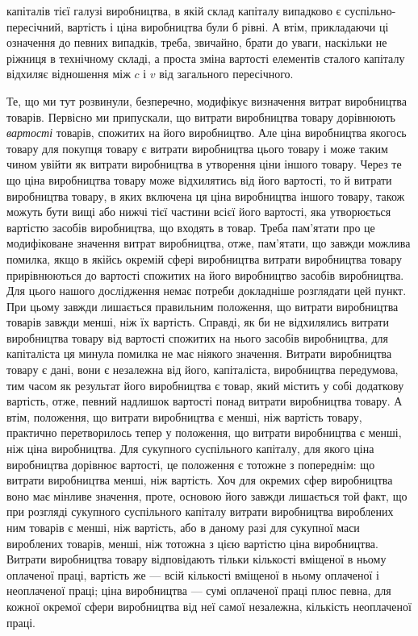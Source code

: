 \parcont{}  %
капіталів тієї галузі виробництва, в якій склад капіталу випадково є суспільно-пересічний, вартість
і ціна виробництва були б
рівні. А втім, прикладаючи ці означення до певних випадків,
треба, звичайно, брати до уваги, наскільки не ріжниця в технічному складі, а проста зміна вартості
елементів сталого капіталу
відхиляє відношення між $c$ і $v$ від загального пересічного.

Те, що ми тут розвинули, безперечно, модифікує визначення
витрат виробництва товарів. Первісно ми припускали, що витрати виробництва товару дорівнюють
\emph{вартості} товарів, спожитих на його виробництво. Але ціна виробництва якогось товару для покупця
товару є витрати виробництва цього товару
і може таким чином увійти як витрати виробництва в утворення
ціни іншого товару. Через те що ціна виробництва товару може
відхилятись від його вартості, то й витрати виробництва товару,
в яких включена ця ціна виробництва іншого товару, також
можуть бути вищі або нижчі тієї частини всієї його вартості,
яка утворюється вартістю засобів виробництва, що входять в
товар. Треба пам’ятати про це модифіковане значення витрат
виробництва, отже, пам’ятати, що завжди можлива помилка,
якщо в якійсь окремій сфері виробництва витрати виробництва товару прирівнюються до вартості
спожитих на його виробництво
засобів виробництва. Для цього нашого дослідження немає потреби докладніше розглядати цей пункт. При
цьому завжди лишається правильним положення, що витрати виробництва товарів
завжди менші, ніж їх вартість. Справді, як би не відхилялись
витрати виробництва товару від вартості спожитих на нього
засобів виробництва, для капіталіста ця минула помилка не має
ніякого значення. Витрати виробництва товару є дані, вони є
незалежна від його, капіталіста, виробництва передумова, тим часом як результат його виробництва є
товар, який містить у
собі додаткову вартість, отже, певний надлишок вартості понад
витрати виробництва товару. А втім, положення, що витрати
виробництва є менші, ніж вартість товару, практично перетворилось тепер у положення, що витрати
виробництва є менші,
ніж ціна виробництва. Для сукупного суспільного капіталу, для
якого ціна виробництва дорівнює вартості, це положення є
тотожне з попереднім: що витрати виробництва менші, ніж вартість. Хоч для окремих сфер виробництва
воно має мінливе значення, проте, основою його завжди лишається той факт, що при розгляді сукупного
суспільного капіталу витрати виробництва
вироблених ним товарів є менші, ніж вартість, або в даному разі
для сукупної маси вироблених товарів, менші, ніж тотожна з цією
вартістю ціна виробництва. Витрати виробництва товару відповідають тільки кількості вміщеної в ньому
оплаченої праці,
вартість же — всій кількості вміщеної в ньому оплаченої і неоплаченої праці; ціна виробництва — сумі
оплаченої праці плюс
певна, для кожної окремої сфери виробництва від неї самої незалежна, кількість неоплаченої праці.
